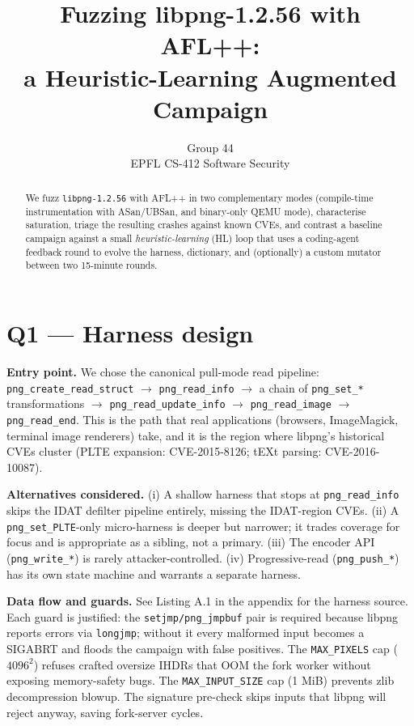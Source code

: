 \documentclass[letterpaper,twocolumn,10pt]{article}
\title{Fuzzing libpng-1.2.56 with AFL++:\\ a Heuristic-Learning Augmented Campaign}
\author{
  \rm Group 44\\
  EPFL CS-412 \textemdash{} Software Security
}
\begin{document}
\maketitle

\begin{abstract}
We fuzz \texttt{libpng-1.2.56} with AFL++ in two complementary modes
(compile-time instrumentation with ASan/UBSan, and binary-only QEMU mode),
characterise saturation, triage the resulting crashes against known CVEs,
and contrast a baseline campaign against a small \emph{heuristic-learning} (HL)
loop that uses a coding-agent feedback round to evolve the harness, dictionary,
and (optionally) a custom mutator between two 15-minute rounds.
\end{abstract}

\section{Q1 — Harness design}
\label{sec:q1}
\textbf{Entry point.}
We chose the canonical pull-mode read pipeline:
\texttt{png\_create\_read\_struct} $\rightarrow$ \texttt{png\_read\_info}
$\rightarrow$ a chain of \texttt{png\_set\_*} transformations $\rightarrow$
\texttt{png\_read\_update\_info} $\rightarrow$ \texttt{png\_read\_image}
$\rightarrow$ \texttt{png\_read\_end}. This is the path that real applications
(browsers, ImageMagick, terminal image renderers) take, and it is the region
where libpng's historical CVEs cluster (PLTE expansion: CVE-2015-8126; tEXt
parsing: CVE-2016-10087).

\textbf{Alternatives considered.}
(i) A shallow harness that stops at \texttt{png\_read\_info} skips the IDAT
defilter pipeline entirely, missing the IDAT-region CVEs.
(ii) A \texttt{png\_set\_PLTE}-only micro-harness is deeper but narrower; it
trades coverage for focus and is appropriate as a sibling, not a primary.
(iii) The encoder API (\texttt{png\_write\_*}) is rarely
attacker-controlled. (iv) Progressive-read (\texttt{png\_push\_*}) has its
own state machine and warrants a separate harness.

\textbf{Data flow and guards.}
See Listing A.1 in the appendix for the harness source. Each guard is justified:
the \texttt{setjmp/png\_jmpbuf} pair is required because libpng reports errors
via \texttt{longjmp}; without it every malformed input becomes a SIGABRT and
floods the campaign with false positives. The \texttt{MAX\_PIXELS} cap
($4096^2$) refuses crafted oversize IHDRs that OOM the fork worker without
exposing memory-safety bugs. The \texttt{MAX\_INPUT\_SIZE} cap (1 MiB) prevents
zlib decompression blowup. The signature pre-check skips inputs that libpng
will reject anyway, saving fork-server cycles.
\end{document}

